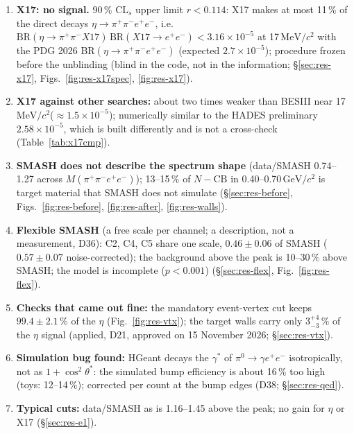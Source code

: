 \documentclass[11pt,a4paper]{article}
\newcommand{\ee}{\ensuremath{e^{+}e^{-}}\xspace}
\newcommand{\pipi}{\ensuremath{\pi^{+}\pi^{-}}\xspace}
\newcommand{\ppee}{\ensuremath{\pi^{+}\pi^{-}e^{+}e^{-}}\xspace}
\newcommand{\Mfour}{\ensuremath{M(\pi^{+}\pi^{-}e^{+}e^{-})}\xspace}
\newcommand{\GeVcc}{\ensuremath{\mathrm{GeV}/c^{2}}\xspace}
\newcommand{\MeVcc}{\ensuremath{\mathrm{MeV}/c^{2}}\xspace}
\newcommand{\BRX}{\ensuremath{\mathrm{BR}(\eta\to\pipi X17)\,\mathrm{BR}(X17\to\ee)}\xspace}
\begin{document}
{\begin{enumerate}
      simulation), a START-free photon cut and 10 times more simulation; it connects with the ECAL analysis of D32 (\S\ref{sec:res-ecal},
      Fig.~\ref{fig:res-ecal}).
\item \textbf{X17: no signal.} 90\,\% CL$_s$ upper limit $r<0.114$: X17 makes at most 11\,\% of the direct decays $\eta\to\ppee$, i.e.\
      $\BRX<3.16\times10^{-5}$ at 17\,\MeVcc with the PDG 2026 BR$(\eta\to\ppee)$\footnotemark{} (expected $2.7\times10^{-5}$); procedure
      frozen before the unblinding (blind in the code, not in the information; \S\ref{sec:res-x17},
      Figs.~\ref{fig:res-x17spec}, \ref{fig:res-x17}).
\item \textbf{X17 against other searches:} about two times weaker than BESIII near 17\,\MeVcc ($\approx1.5\times10^{-5}$); numerically similar to
      the HADES preliminary $2.58\times10^{-5}$, which is built differently and is not a cross-check (Table~\ref{tab:x17cmp}).
\item \textbf{SMASH does not describe the spectrum shape} (data/SMASH 0.74--1.27 across \Mfour); 13--15\,\% of $N-\mathrm{CB}$ in
      0.40--0.70\,\GeVcc is target material that SMASH does not simulate (\S\ref{sec:res-before}, Figs.~\ref{fig:res-before}, \ref{fig:res-after}, \ref{fig:res-walls}).
\item \textbf{Flexible SMASH} (a free scale per channel; a description, not a measurement, D36): C2, C4, C5 share one scale, $0.46\pm0.06$
      of SMASH ($0.57\pm0.07$ noise-corrected); the background above the peak is 10--30\,\% above SMASH; the model is incomplete ($p<0.001$)
      (\S\ref{sec:res-flex}, Fig.~\ref{fig:res-flex}).
\item \textbf{Checks that came out fine:} the mandatory event-vertex cut keeps $99.4\pm2.1$\,\% of the $\eta$ (Fig.~\ref{fig:res-vtx}); the
      target walls carry only $3^{+4}_{-3}$\,\% of the $\eta$ signal (applied, D21, approved on 15 November 2026; \S\ref{sec:res-vtx}).
\item \textbf{Simulation bug found:} HGeant decays the $\gamma^*$ of $\pi^0\to\gamma\ee$ isotropically, not as $1+\cos^2\theta^*$: the simulated
      bump efficiency is about 16\,\% too high (toys: 12--14\,\%); corrected per count at the bump edges (D38; \S\ref{sec:res-qed}).
\item \textbf{Typical cuts:} data/SMASH as is 1.16--1.45 above the peak; no gain for $\eta$ or X17 (\S\ref{sec:res-e1}).
\end{enumerate}}
\end{document}
